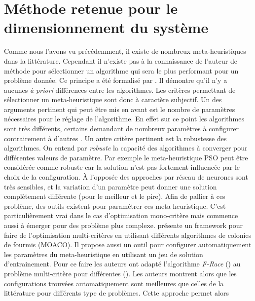 \section{Méthode retenue pour le dimensionnement du système} %
\label{sec:methode_retenue_pour_le_dimensionnement_du_systeme}
Comme nous l’avons vu précédemment, il existe de nombreux meta-heuristiques dans
la littérature. Cependant il n’existe pas à la connaissance de l’auteur de méthode
pour sélectionner un algorithme qui sera le plus performant pour un problème donnée.
Ce principe a été formalisé par \cite{Wolpert199767} . Il démontre qu’il
n’y a aucunes \emph{à priori} différences entre les algorithmes. Les critères
permettant de sélectionner un meta-heuristique sont donc à caractère subjectif.
Un des arguments pertinent qui peut être mis en avant est le nombre de paramètres
nécessaires pour le réglage de l’algorithme. En effet sur ce point les algorithmes
sont très différents, certains demandant de nombreux paramètres à configurer
 contrairement
à d’autres . Un autre critère pertinent
est la robustesse des algorithmes. On entend par \emph{robuste} la capacité des algorithmes
à converger pour différentes valeurs de paramètre. Par exemple le meta-heuristique PSO
peut être considérée comme robuste  car la solution n’est
pas fortement influencée par le choix de la configuration.
À l’opposée des approches par réseau de neurones  sont
très sensibles, et la variation d’un paramètre peut donner une solution complètement
différente (pour le meilleur et le pire).
Afin de pallier à ces problème, des outils existent pour paramétrer ces meta-heuristique.
C’est particulièrement vrai dans le cas d’optimisation mono-critère mais commence
aussi à émerger pour des problème plus complexe. \cite{Lopez-Ibanez2012861}
présente un framework pour faire de l’optimisation multi-critères en utilisant
différents algorithmes de colonies de fourmis (MOACO). Il propose aussi un outil
pour configurer automatiquement les paramètres du meta-heuristique en utilisant un jeu de solution
d’entrainement. Pour ce faire les auteurs ont adapté l’algorithme \emph{F-Race} (\cite{Lopez-Ibanez2011})
au problème multi-critère pour différentes (\cite{Birattari2010311,Zitzler2003117}). Les auteurs montrent
alors que les configurations trouvées automatiquement sont meilleures que celles
de la littérature pour différents type de problèmes. Cette approche permet alors
